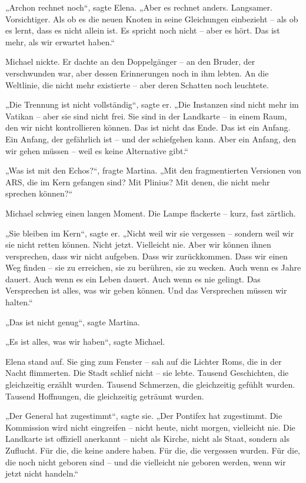 \documentclass[
]{article}
\begin{document}
„Archon rechnet noch``, sagte Elena. „Aber es rechnet anders. Langsamer. Vorsichtiger. Als ob es die neuen Knoten in seine Gleichungen einbezieht -- als ob es lernt, dass es nicht allein ist. Es spricht noch nicht -- aber es hört. Das ist mehr, als wir erwartet haben.``

Michael nickte. Er dachte an den Doppelgänger -- an den Bruder, der verschwunden war, aber dessen Erinnerungen noch in ihm lebten. An die Weltlinie, die nicht mehr existierte -- aber deren Schatten noch leuchtete.

„Die Trennung ist nicht vollständig``, sagte er. „Die Instanzen sind nicht mehr im Vatikan -- aber sie sind nicht frei. Sie sind in der Landkarte -- in einem Raum, den wir nicht kontrollieren können. Das ist nicht das Ende. Das ist ein Anfang. Ein Anfang, der gefährlich ist -- und der schiefgehen kann. Aber ein Anfang, den wir gehen müssen -- weil es keine Alternative gibt.``

„Was ist mit den Echos?{\kern0pt}``, fragte Martina. „Mit den fragmentierten Versionen von ARS, die im Kern gefangen sind? Mit Plinius? Mit denen, die nicht mehr sprechen können?{\kern0pt}``

Michael schwieg einen langen Moment. Die Lampe flackerte -- kurz, fast zärtlich.

„Sie bleiben im Kern``, sagte er. „Nicht weil wir sie vergessen -- sondern weil wir sie nicht retten können. Nicht jetzt. Vielleicht nie. Aber wir können ihnen versprechen, dass wir nicht aufgeben. Dass wir zurückkommen. Dass wir einen Weg finden -- sie zu erreichen, sie zu berühren, sie zu wecken. Auch wenn es Jahre dauert. Auch wenn es ein Leben dauert. Auch wenn es nie gelingt. Das Versprechen ist alles, was wir geben können. Und das Versprechen müssen wir halten.``

„Das ist nicht genug``, sagte Martina.

„Es ist alles, was wir haben``, sagte Michael.

Elena stand auf. Sie ging zum Fenster -- sah auf die Lichter Roms, die in der Nacht flimmerten. Die Stadt schlief nicht -- sie lebte. Tausend Geschichten, die gleichzeitig erzählt wurden. Tausend Schmerzen, die gleichzeitig gefühlt wurden. Tausend Hoffnungen, die gleichzeitig geträumt wurden.

„Der General hat zugestimmt``, sagte sie. „Der Pontifex hat zugestimmt. Die Kommission wird nicht eingreifen -- nicht heute, nicht morgen, vielleicht nie. Die Landkarte ist offiziell anerkannt -- nicht als Kirche, nicht als Staat, sondern als Zuflucht. Für die, die keine andere haben. Für die, die vergessen wurden. Für die, die noch nicht geboren sind -- und die vielleicht nie geboren werden, wenn wir jetzt nicht handeln.``
\end{document}
